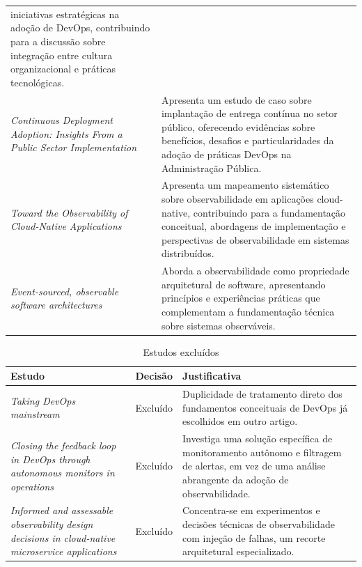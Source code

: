 {\begin{longtable}{@{}>{\raggedright\arraybackslash}p{4.2cm}
                    p{\dimexpr\linewidth-4.2cm-2\tabcolsep\relax}@{}}
    iniciativas estratégicas na adoção de DevOps, contribuindo para a
    discussão sobre integração entre cultura organizacional e práticas
    tecnológicas. \\
\addlinespace
\cite{linjama2026}\newline \emph{Continuous Deployment Adoption: Insights From
  a Public Sector Implementation}
  & Apresenta um estudo de caso sobre implantação de entrega contínua no
    setor público, oferecendo evidências sobre benefícios, desafios e
    particularidades da adoção de práticas DevOps na Administração
    Pública. \\
\addlinespace
\cite{kosinska2023}\newline \emph{Toward the Observability of Cloud-Native
  Applications}
  & Apresenta um mapeamento sistemático sobre observabilidade em aplicações
    cloud-native, contribuindo para a fundamentação conceitual, abordagens
    de implementação e perspectivas de observabilidade em sistemas
    distribuídos. \\
\addlinespace
\cite{alongi2022}\newline \emph{Event-sourced, observable software
  architectures}
  & Aborda a observabilidade como propriedade arquitetural de software,
    apresentando princípios e experiências práticas que complementam a
    fundamentação técnica sobre sistemas observáveis. \\
\end{longtable}
}

\begin{table}[H]
\centering
\caption{Estudos excluídos}\label{tab:reprovados}
\footnotesize
\begin{tabularx}{\linewidth}{@{}>{\raggedright\arraybackslash}p{4.2cm}
                                >{\raggedright\arraybackslash}p{2.2cm}X@{}}
\toprule
\textbf{Estudo} & \textbf{Decisão} & \textbf{Justificativa} \\
\midrule
\cite{gall2022}\newline \emph{Taking DevOps mainstream}
  & Excluído
  & Duplicidade de tratamento direto dos fundamentos conceituais de DevOps já
    escolhidos em outro artigo. \\
\addlinespace
\cite{hrusto2021}\newline \emph{Closing the feedback loop in DevOps through
  autonomous monitors in operations}
  & Excluído
  & Investiga uma solução específica de monitoramento autônomo e filtragem de
    alertas, em vez de uma análise abrangente da adoção de
    observabilidade. \\
\addlinespace
\cite{borges2024}\newline \emph{Informed and assessable observability design
  decisions in cloud-native microservice applications}
  & Excluído
  & Concentra-se em experimentos e decisões técnicas de observabilidade com
    injeção de falhas, um recorte arquitetural especializado. \\
\bottomrule
\end{tabularx}
\end{table}

